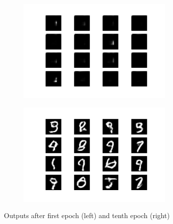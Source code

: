 \documentclass{article}
\begin{document}
\begin{appendices}
\begin{figure}[H]
\centering
\begin{subfigure}{.5\textwidth}
  \centering
  \includegraphics[width=3in]{csci-8110/hw-4/images/generated_plot_e001.png}
  \label{fig:ep1_2}
\end{subfigure}%
\begin{subfigure}{.5\textwidth}
  \centering
  \includegraphics[width=3in]{csci-8110/hw-4/images/generated_plot_e010.png}
  \label{fig:ep100}
\end{subfigure}
\caption{Outputs after first epoch (left) and tenth epoch (right)}
\label{fig:ep1-10}
\end{figure}


\end{appendices}
\end{document}
